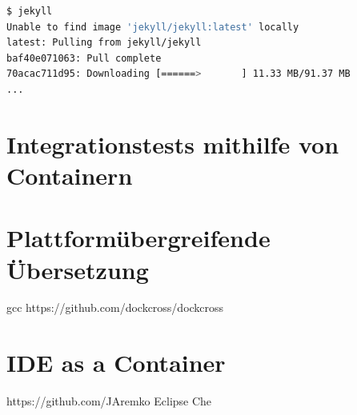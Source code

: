 \begin{lstlisting}[caption=Automatische Installation der Docker-basierten CLI-Anwendungen, language=bash, label=lst:docker-auto-install-cli]
$ jekyll
Unable to find image 'jekyll/jekyll:latest' locally
latest: Pulling from jekyll/jekyll
baf40e071063: Pull complete
70acac711d95: Downloading [======>       ] 11.33 MB/91.37 MB
...
\end{lstlisting}


\section{Integrationstests mithilfe von Containern}
\label{sec:containerbasiertes-testen}

\section{Plattformübergreifende Übersetzung}
\label{sec:plattformuebergreifende-uebersetzung}
gcc
https://github.com/dockcross/dockcross

\section{IDE as a Container}
\label{sec:ideasacontainer}
https://github.com/JAremko
Eclipse Che


